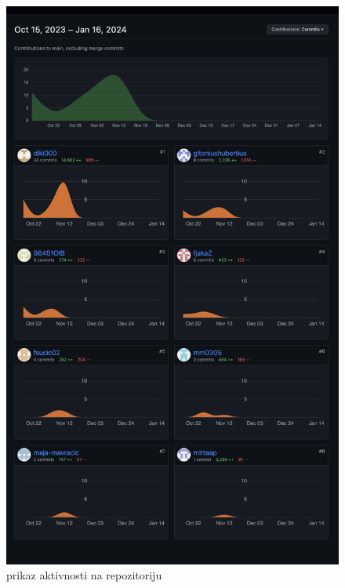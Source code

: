 		\begin{figure}[hbt!]
			\centering
			\includegraphics[width=0.7\linewidth]{slike/dijagrampregleda.png}
			\caption{prikaz aktivnosti na repozitoriju}
			\label{fig:dijagrampregleda}
		\end{figure}
		
		
		
		
		
	
		
	